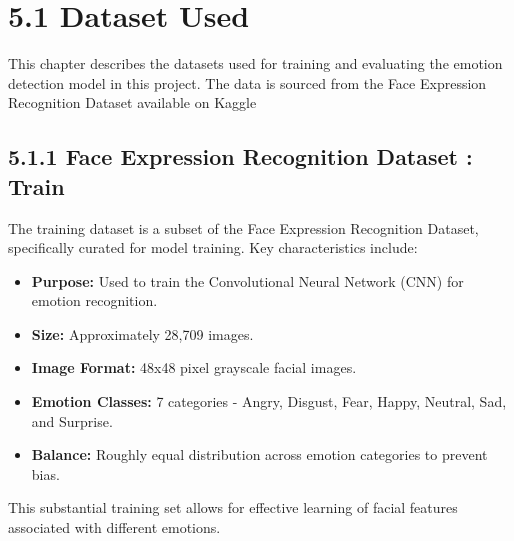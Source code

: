 \documentclass[12pt]{report}
\begin{document}
\section*{5.1 Dataset Used}
\begin{center}
    \justify
This chapter describes the datasets used for training and evaluating the emotion detection model in this project. The data is sourced from the Face Expression Recognition Dataset available on Kaggle
\end{center}
\vspace{0.7em}
\subsection*{5.1.1 Face Expression Recognition Dataset : Train}
\begin{center}
    \justify
The training dataset is a subset of the Face Expression Recognition Dataset, specifically curated for model training. Key characteristics include:
\begin{itemize}
    \item \textbf{Purpose:} Used to train the Convolutional Neural Network (CNN) for emotion recognition.
    \item \textbf{Size:} Approximately 28,709 images.
    \item \textbf{Image Format:} 48x48 pixel grayscale facial images.
    \item \textbf{Emotion Classes:} 7 categories - Angry, Disgust, Fear, Happy, Neutral, Sad, and Surprise.
    \item \textbf{Balance:} Roughly equal distribution across emotion categories to prevent bias.
\end{itemize}
This substantial training set allows for effective learning of facial features associated with different emotions.
\end{center}
\vspace{0.7em}
\end{document}
